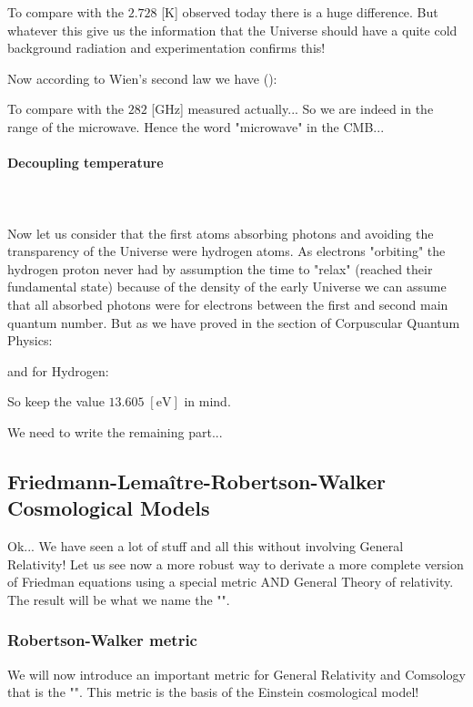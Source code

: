 	To compare with the $2.728$ [K] observed today there is a huge difference. But whatever this give us the information that the Universe should have a quite cold background radiation and experimentation confirms this!
	
	Now according to Wien's second law we have ():
	
	To compare with the $282$ [GHz] measured actually... So we are indeed in the range of the microwave. Hence the word "microwave" in the CMB...
	
	\paragraph{Decoupling temperature}\mbox{}\\\\
	Now let us consider that the first atoms absorbing photons and avoiding the transparency of the Universe were hydrogen atoms. As electrons "orbiting" the hydrogen proton never had by assumption the time to "relax" (reached their fundamental state) because of the density of the early Universe we can assume that all absorbed photons were for electrons between the first and second main quantum number. But as we have proved in the section of Corpuscular Quantum Physics:
	
	and for Hydrogen:
	
	So keep the value $13.605\;[\text{eV}]$ in mind.
	
	We need to write the remaining part...
	
	\pagebreak
	\subsection{Friedmann-Lemaître-Robertson-Walker Cosmological Models}
	Ok... We have seen a lot of stuff and all this without involving General Relativity! Let us see now a more robust way to derivate a more complete version of Friedman equations using a special metric AND General Theory of relativity. The result will be what we name the "".
	
	\subsubsection{Robertson-Walker metric}
	We will now introduce an important metric for General Relativity and Comsology that is the "". This metric is the basis of the Einstein cosmological model!
	
